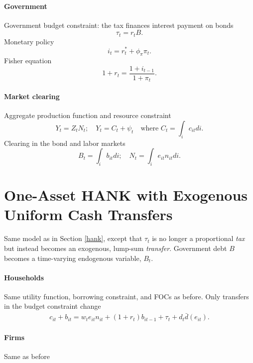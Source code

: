 \documentclass[11pt,a4paper]{article}
\begin{document}
\paragraph{Government}
Government budget constraint: the tax finances interest payment on bonds
\begin{equation*}
\tau_t=r_tB.
\end{equation*}
Monetary policy
\begin{equation*}
i_t=r_t^*+\phi_{\pi}\pi_t.
\end{equation*}
Fisher equation
\begin{equation*}
1+r_t=\frac{1+i_{t-1}}{1+\pi_t}.
\end{equation*}


\paragraph{Market clearing} Aggregate production function and resource constraint
\begin{equation*}
Y_t=Z_tN_t;\quad Y_t=C_t+\psi_t\quad\text{where }C_t=\int_i c_{it}di.
\end{equation*}
Clearing in the bond and labor markets
\begin{equation*}
B_t=\int_ib_{it}di;\quad N_t=\int_ie_{it}n_{it}di.
\end{equation*}




\section{One-Asset HANK with Exogenous Uniform Cash Transfers}
\label{hanktransfer}
Same model as in Section \ref{hank}, except that $\tau_t$ is no longer a proportional \textit{tax} but instead becomes an exogenous, lump-sum \textit{transfer}. Government debt $B$ becomes a time-varying endogenous variable, $B_t$.


\paragraph{Households}
Same utility function, borrowing constraint, and FOCs as before. Only transfers in the budget constraint change
\begin{align*}
c_{it}+b_{it}=w_te_{it}n_{it}+(1+r_t)b_{it-1}+\tau_t+d_t\bar{d}(e_{it}).
\end{align*}


\paragraph{Firms} Same as before
\end{document}
